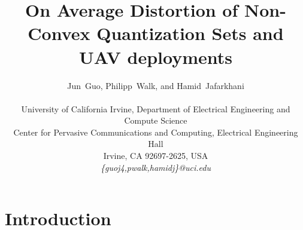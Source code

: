 \documentclass[smallabstract,smallcaptions]{dccpaper}
\begin{document}
%
\title{On Average Distortion of Non-Convex Quantization Sets and UAV deployments}


\newtheorem{corollary}{Corollary}

\author{Jun~Guo, Philipp~Walk, and Hamid~Jafarkhani\\
  {\small\hspace{-0.5cm}\begin{minipage}{\textwidth}
\begin{tabular}{c}
University of California Irvine, Department of Electrical Engineering and Compute Science\\
Center for Pervasive Communications and Computing, Electrical Engineering Hall  \\
Irvine, CA 92697-2625, USA \\
{\it\{guoj4,pwalk,hamidj\}@uci.edu}
\end{tabular}
\end{minipage}}
}

\maketitle

\section{Introduction}
\end{document}
